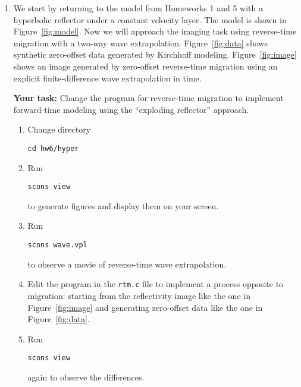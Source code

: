 \begin{enumerate}

\item We start by returning to the model from Homeworks 1 and 5 with a
  hyperbolic reflector under a constant velocity layer.  The model is
  shown in Figure~\ref{fig:model}. Now we will approach the imaging
  task using reverse-time migration with a two-way wave
  extrapolation. Figure~\ref{fig:data} shows synthetic zero-offset
  data generated by Kirchhoff modeling. Figure~\ref{fig:image} shows
  an image generated by zero-offset reverse-time migration using an
  explicit finite-difference wave extrapolation in time.

   \textbf{Your task:} Change the program for reverse-time migration to
  implement forward-time modeling using the ``exploding reflector''
  approach.

    \begin{enumerate}
    \item Change directory 
\begin{verbatim}
cd hw6/hyper
\end{verbatim}
    \item Run
\begin{verbatim}
scons view
\end{verbatim}
      to generate figures and display them on your screen.
  \item Run
\begin{verbatim}
scons wave.vpl
\end{verbatim}
      to observe a movie of reverse-time wave extrapolation.
    \item Edit the program in the \texttt{rtm.c} file to implement a process opposite to migration: starting from the reflectivity image like the one in Figure~\ref{fig:image} and generating zero-offset data like the one in Figure~\ref{fig:data}. 
    \item Run
\begin{verbatim}
scons view
\end{verbatim}
      again to observe the differences.
    \end{enumerate}
 




\end{enumerate}
